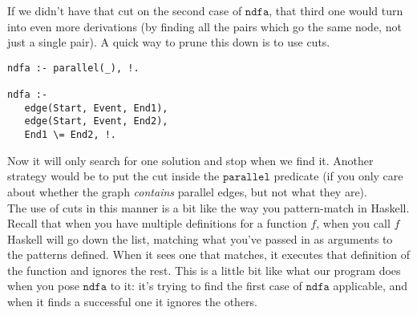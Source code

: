 \documentclass[a4paper,12pt]{article}
\newcommand{\kwa}[1]{\mathtt{#1}}
\begin{document}
\noindent
If we didn't have that cut on the second case of $\kwa{ndfa}$, that third one would turn into even more derivations (by finding all the pairs which go the same node, not just a single pair). A quick way to prune this down is to use cuts.

\begin{lstlisting}
ndfa :- parallel(_), !.

ndfa :-
   edge(Start, Event, End1),
   edge(Start, Event, End2),
   End1 \= End2, !.
\end{lstlisting}

\noindent
Now it will only search for one solution and stop when we find it. Another strategy would be to put the cut inside the $\kwa{parallel}$ predicate (if you only care about whether the graph \textit{contains} parallel edges, but not what they are). \\

\noindent
The use of cuts in this manner is a bit like the way you pattern-match in Haskell. Recall that when you have multiple definitions for a function $f$, when you call $f$ Haskell will go down the list, matching what you've passed in as arguments to the patterns defined. When it sees one that matches, it executes that definition of the function and ignores the rest. This is a little bit like what our program does when you pose $\kwa{ndfa}$ to it: it's trying to find the first case of $\kwa{ndfa}$ applicable, and when it finds a successful one it ignores the others.
\end{document}
